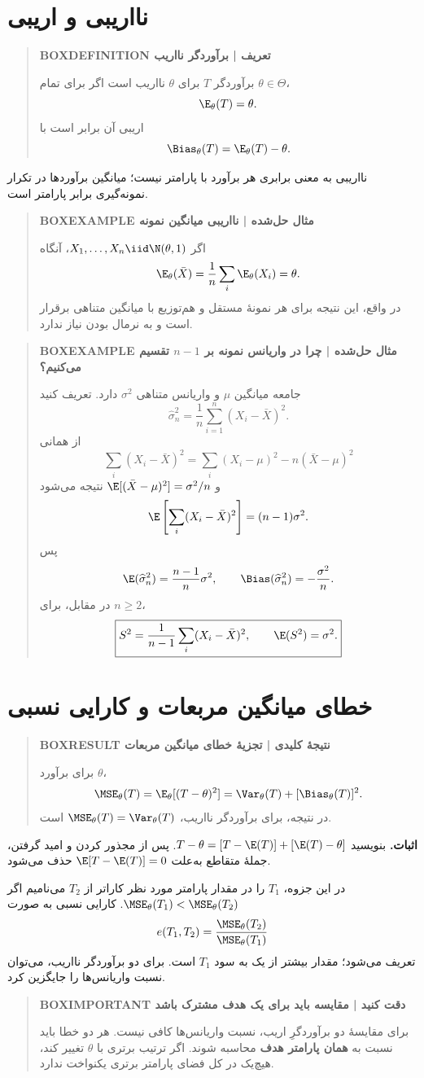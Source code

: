 \section{نااریبی و اریبی}
\begin{quote}\textbf{BOXDEFINITION تعریف | برآوردگر نااریب}\par 
برآوردگر $T$ برای $\theta$ نااریب است اگر برای تمام $\theta\in\Theta$،
\[\E_\theta(T)=\theta.\]
اریبی آن برابر است با
\[\Bias_\theta(T)=\E_\theta(T)-\theta.\]
\end{quote}
نااریبی به معنی برابری هر برآورد با پارامتر نیست؛ میانگین برآوردها در تکرار نمونه‌گیری برابر پارامتر است.
\begin{quote}\textbf{BOXEXAMPLE مثال حل‌شده | نااریبی میانگین نمونه}\par 
اگر $X_1,\ldots,X_n\iid\N(\theta,1)$، آنگاه
\[\E_\theta(\bar X)=\frac1n\sum_i\E_\theta(X_i)=\theta.\]
در واقع، این نتیجه برای هر نمونهٔ مستقل و هم‌توزیع با میانگین متناهی برقرار است و به نرمال بودن نیاز ندارد.
\end{quote}
\begin{quote}\textbf{BOXEXAMPLE مثال حل‌شده | چرا در واریانس نمونه بر $n-1$ تقسیم می‌کنیم؟}\par 
جامعه میانگین $\mu$ و واریانس متناهی $\sigma^2$ دارد. تعریف کنید
\[\widehat\sigma_n^2=\frac1n\sum_{i=1}^n(X_i-\bar X)^2.\]
از همانی
\[\sum_i(X_i-\bar X)^2=\sum_i(X_i-\mu)^2-n(\bar X-\mu)^2\]
و $\E[(\bar X-\mu)^2]=\sigma^2/n$ نتیجه می‌شود
\[
\E\left[\sum_i(X_i-\bar X)^2\right]=(n-1)\sigma^2.
\]
پس
\[\E(\widehat\sigma_n^2)=\frac{n-1}{n}\sigma^2,\qquad
\Bias(\widehat\sigma_n^2)=-\frac{\sigma^2}{n}.\]
در مقابل، برای $n\ge2$،
\[\boxed{S^2=\frac1{n-1}\sum_i(X_i-\bar X)^2,\qquad \E(S^2)=\sigma^2.}\]
\end{quote}
\section{خطای میانگین مربعات و کارایی نسبی}
\begin{quote}\textbf{BOXRESULT نتیجهٔ کلیدی | تجزیهٔ خطای میانگین مربعات}\par 
برای برآورد $\theta$،
\[
\MSE_\theta(T)=\E_\theta[(T-\theta)^2]
=\Var_\theta(T)+[\Bias_\theta(T)]^2.
\]
در نتیجه، برای برآوردگر نااریب، $\MSE_\theta(T)=\Var_\theta(T)$ است.
\end{quote}
\textbf{اثبات.} بنویسید $T-\theta=[T-\E(T)]+[\E(T)-\theta]$. پس از مجذور کردن و امید گرفتن، جملهٔ متقاطع به‌علت $\E[T-\E(T)]=0$ حذف می‌شود.

در این جزوه، $T_1$ را در مقدار پارامتر مورد نظر کاراتر از $T_2$ می‌نامیم اگر $\MSE_\theta(T_1)<\MSE_\theta(T_2)$. کارایی نسبی به صورت
\[
e(T_1,T_2)=\frac{\MSE_\theta(T_2)}{\MSE_\theta(T_1)}
\]
تعریف می‌شود؛ مقدار بیشتر از یک به سود $T_1$ است. برای دو برآوردگر نااریب، می‌توان نسبت واریانس‌ها را جایگزین کرد.
\begin{quote}\textbf{BOXIMPORTANT دقت کنید | مقایسه باید برای یک هدف مشترک باشد}\par 
برای مقایسهٔ دو برآوردگرِ اریب، نسبت واریانس‌ها کافی نیست. هر دو خطا باید نسبت به \textbf{همان پارامتر هدف} محاسبه شوند. اگر ترتیب برتری با $\theta$ تغییر کند، هیچ‌یک در کل فضای پارامتر برتری یکنواخت ندارد.
\end{quote}
